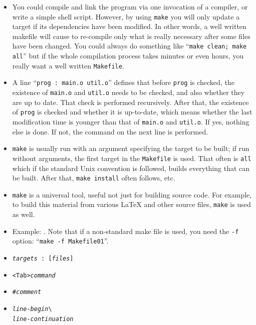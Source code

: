 \begin{itemize}
\item You could compile and link the program via one invocation of a compiler,
or write a simple shell script.  However, by using \texttt{make} you will only
update a target if its dependencies have been modified.  In other words, a well
written makefile will cause to re-compile only what is really necessary after
some files have been changed.  You could always do something like
``\texttt{make clean; make all}'' but if the whole compilation process takes
minutes or even hours, you really want a well written \texttt{Makefile}.
\item A line ``\verb#prog : main.o util.o#'' defines that before \texttt{prog}
is checked, the existence of
\texttt{main.o} and \texttt{util.o} needs to be checked, and also whether they
are up to date.  That check is performed recursively.  After that, the existence
of \texttt{prog} is checked and whether it is up-to-date, which means whether
the last modification time is younger than that of \texttt{main.o} and
\texttt{util.o}.  If yes, nothing else is done.  If not, the command on the next
line is performed.
\item \texttt{make} is usually run with an argument specifying the target to be
built; if run without arguments, the first target in the \texttt{Makefile} is
used.  That often is \texttt{all} which if the standard Unix convention is
followed, builds everything that can be built.  After that, \texttt{make
install} often follows, etc.
\item \texttt{make} is a universal tool, useful not just for building source
code.  For example, to build this material from various \LaTeX{} and other source
files, \texttt{make} is used as well.
\item Example: .  Note that if a non-standard
make file is used, you need the \texttt{-f} option: ``\texttt{make -f
Makefile01}''.
\end{itemize}


\begin{slide}
\begin{itemize}
\item {}
\texttt{\emph{targets} : [\emph{files}]}
\item {} \verb#<Tab>#\texttt{\emph{command}}
\item {} \texttt{\#\emph{comment}}
\item {}
\texttt{\emph{line-begin}}\verb#\#\\
\makebox[4cm][l]{~} \texttt{\emph{line-continuation}}
\end{itemize}
\end{slide}

